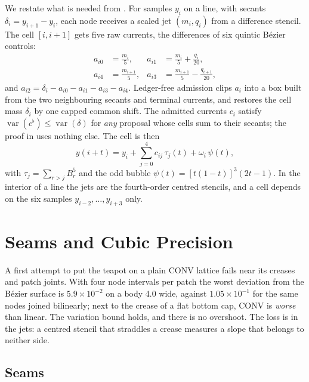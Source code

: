 \documentclass[journal]{IEEEtran}
\newcommand{\var}{\operatorname{var}}
\begin{document}
We restate what is needed from \cite{convpaper}. For samples $y_i$ on a
line, with secants $\delta_i=y_{i+1}-y_i$, each node receives a scaled jet
$(m_i,q_i)$ from a difference stencil. The cell $[i,i+1]$ gets five raw
currents, the differences of six quintic B\'ezier controls:
\begin{align}
 a_{i0}&=\tfrac{m_i}{5}, & a_{i1}&=\tfrac{m_i}{5}+\tfrac{q_i}{20},\nonumber\\
 a_{i4}&=\tfrac{m_{i+1}}{5}, & a_{i3}&=\tfrac{m_{i+1}}{5}-\tfrac{q_{i+1}}{20},
 \label{eq:raw}
\end{align}
and $a_{i2}=\delta_i-a_{i0}-a_{i1}-a_{i3}-a_{i4}$. Ledger-free admission
clips $a_i$ into a box built from the two neighbouring secants and
terminal currents, and restores the cell mass $\delta_i$ by one capped
common shift. The admitted currents $c_i$ satisfy
$\var(c^\flat)\le\var(\delta)$ for \emph{any} proposal whose cells sum to
their secants; the proof in \cite{convpaper} uses nothing else. The cell
is then
\begin{equation}
 y(i+t)=y_i+\sum_{j=0}^{4}c_{ij}\,\tau_j(t)+\omega_i\,\psi(t),
 \label{eq:cell}
\end{equation}
with $\tau_j=\sum_{r>j}B_r^5$ and the odd bubble
$\psi(t)=[t(1-t)]^3(2t-1)$. In the interior of a line the jets are the
fourth-order centred stencils, and a cell depends on the six samples
$y_{i-2},\ldots,y_{i+3}$ only.

\section{Seams and Cubic Precision}
\label{sec:seams}

A first attempt to put the teapot on a plain CONV lattice fails near its
creases and patch joints. With four node intervals per patch the worst
deviation from the B\'ezier surface is $5.9\times10^{-2}$ on a body 4.0
wide, against $1.05\times10^{-1}$ for the same nodes joined bilinearly;
next to the crease of a flat bottom cap, CONV is \emph{worse} than linear.
The variation bound holds, and there is no overshoot. The loss is in the
jets: a centred stencil that straddles a crease measures a slope that
belongs to neither side.

\subsection{Seams}
\end{document}
